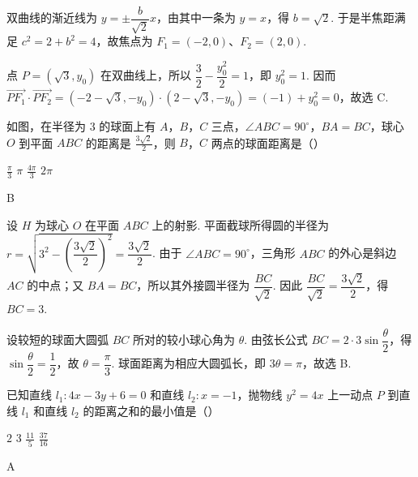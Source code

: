 \begin{solution}
双曲线的渐近线为 \(y=\pm\dfrac{b}{\sqrt{2}}x\)，由其中一条为 \(y=x\)，得 \(b=\sqrt{2}\). 于是半焦距满足 \(c^2=2+b^2=4\)，故焦点为 \(F_1=(-2,0)\)、\(F_2=(2,0)\).

点 \(P=(\sqrt{3},y_0)\) 在双曲线上，所以 \(\dfrac{3}{2}-\dfrac{y_0^2}{2}=1\)，即 \(y_0^2=1\). 因而
\(\overrightarrow{PF_1}\cdot\overrightarrow{PF_2}=(-2-\sqrt{3},-y_0)\cdot(2-\sqrt{3},-y_0)=(-1)+y_0^2=0\)，故选 C.
\end{solution}

\begin{problem}
如图，在半径为 3 的球面上有 \(A\)，\(B\)，\(C\) 三点，\(\angle ABC = 90^{\circ}\)，\(BA = BC\)，球心 \(O\) 到平面 \(ABC\) 的距离是 \(\frac{3\sqrt{2}}{2}\)，则 \(B\)，\(C\) 两点的球面距离是（\quad）


\choices
    {\(\frac{\pi}{3}\)}
    {\(\pi\)}
    {\(\frac{4\pi}{3}\)}
    {\(2\pi\)}
\end{problem}

\begin{answer}
B
\end{answer}

\begin{solution}
设 \(H\) 为球心 \(O\) 在平面 \(ABC\) 上的射影. 平面截球所得圆的半径为
\(r=\sqrt{3^2-\left(\dfrac{3\sqrt{2}}{2}\right)^2}=\dfrac{3\sqrt{2}}{2}\). 由于 \(\angle ABC=90^{\circ}\)，三角形 \(ABC\) 的外心是斜边 \(AC\) 的中点；又 \(BA=BC\)，所以其外接圆半径为 \(\dfrac{BC}{\sqrt{2}}\). 因此 \(\dfrac{BC}{\sqrt{2}}=\dfrac{3\sqrt{2}}{2}\)，得 \(BC=3\).

设较短的球面大圆弧 \(BC\) 所对的较小球心角为 \(\theta\). 由弦长公式 \(BC=2\cdot3\sin\dfrac{\theta}{2}\)，得 \(\sin\dfrac{\theta}{2}=\dfrac12\)，故 \(\theta=\dfrac{\pi}{3}\). 球面距离为相应大圆弧长，即 \(3\theta=\pi\)，故选 B.
\end{solution}

\begin{problem}
已知直线 \(l_1: 4x - 3y + 6 = 0\) 和直线 \(l_2: x = -1\)，抛物线 \(y^2 = 4x\) 上一动点 \(P\) 到直线 \(l_1\) 和直线 \(l_2\) 的距离之和的最小值是（\quad）

\choices
    {\(2\)}
    {\(3\)}
    {\(\frac{11}{5}\)}
    {\(\frac{37}{16}\)}
\end{problem}

\begin{answer}
A
\end{answer}

